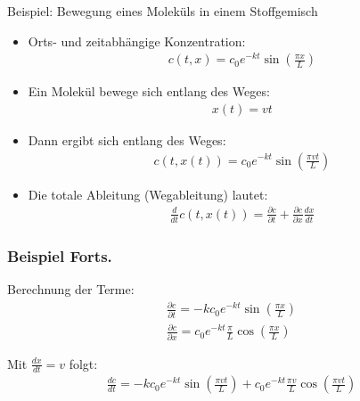 \begin{frame}{Beispiel: Bewegung eines Moleküls in einem Stoffgemisch}
  \begin{itemize}
  \item 
    Orts- und zeitabhängige Konzentration:
    \begin{gather*}
      c(t,x) = c_0 e^{-kt} \sin\left(\frac{\pi x}{L}\right)
    \end{gather*}
    
  \item Ein Molekül bewege sich entlang des Weges:
    \begin{gather*}
      x(t) = vt
    \end{gather*}
    
  \item Dann ergibt sich entlang des Weges:
    \begin{gather*}
      c(t,x(t)) = c_0 e^{-kt} \sin\left(\frac{\pi vt}{L}\right)
    \end{gather*}
    
  \item Die totale Ableitung (Wegableitung) lautet:
    \begin{gather*}
      \frac{d}{dt} c(t,x(t)) 
      = \frac{\partial c}{\partial t} 
      + \frac{\partial c}{\partial x} \frac{dx}{dt}
    \end{gather*}
  \end{itemize}
\end{frame}

\begin{frame}
  \frametitle<presentation>{Beispiel Forts.}
Berechnung der Terme:
\begin{gather*}
\frac{\partial c}{\partial t} 
= -k c_0 e^{-kt} \sin\left(\frac{\pi x}{L}\right)
\\
\frac{\partial c}{\partial x} 
= c_0 e^{-kt} \frac{\pi}{L} \cos\left(\frac{\pi x}{L}\right)
\end{gather*}

Mit \( \frac{dx}{dt} = v \) folgt:
\begin{gather*}
\frac{d c}{dt}
=
- k c_0 e^{-kt} \sin\left(\frac{\pi vt}{L}\right)
+
c_0 e^{-kt} \frac{\pi v}{L} \cos\left(\frac{\pi vt}{L}\right)
\end{gather*}

\end{frame}

